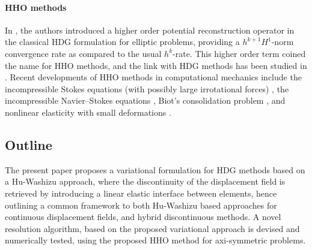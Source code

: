 \paragraph{HHO methods}

In \cite{di_pietro_hybrid_2015, di_pietro_arbitrary-order_2014}, the authors introduced a higher order potential reconstruction operator
in the classical HDG formulation for elliptic problems,
providing a $h^{k+1} H^1$-norm convergence rate as compared to the usual $h^k$-rate. This higher order term coined the name for HHO methods, and the link
with HDG methods has been studied in \cite{cockburn_bridging_2016}.
Recent developments of HHO methods in
computational mechanics include the incompressible Stokes
equations (with possibly large irrotational forces) \cite{di_pietro_discontinuous_2016}, the
incompressible Navier–Stokes equations \cite{di_pietro_hybrid_2018}, Biot’s consolidation problem \cite{boffi_nonconforming_2016},
and nonlinear elasticity with small
deformations \cite{botti_hybrid_2017}.

\subsection{Outline}

The present paper proposes a variational formulation for HDG methods
based on a Hu-Washizu approach, where the discontinuity of the
displacement field is retrieved by introducing a linear elastic
interface between elements, hence outlining a common framework to both
Hu-Washizu based approaches for continuous displacement fields, and
hybrid discontinuous methods. A novel resolution algorithm, based on the
proposed variational approach is devised and numerically tested, using
the proposed HHO method for axi-symmetric problems.



